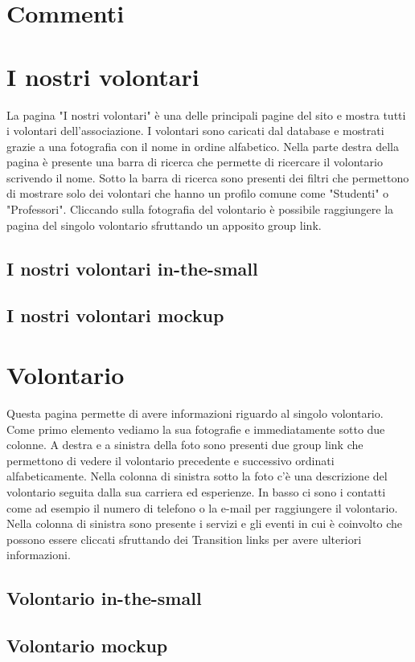     \section{Commenti}
    \section{I nostri volontari}
    La pagina "I nostri volontari" è una delle principali pagine del sito e
    mostra tutti i volontari dell'associazione. I volontari sono caricati dal
    database e mostrati grazie a una fotografia con il nome in ordine
    alfabetico. Nella parte destra della pagina è presente una barra di ricerca
    che permette di ricercare il volontario scrivendo il nome. Sotto la barra di
    ricerca sono presenti dei filtri che permettono di mostrare solo dei volontari che hanno un
    profilo comune come "Studenti" o "Professori".
    Cliccando sulla fotografia del volontario è possibile raggiungere la pagina
    del singolo volontario sfruttando un apposito group link.
        \subsection{I nostri volontari in-the-small}
        \subsection{I nostri volontari mockup}
    \section{Volontario}
    Questa pagina permette di avere informazioni riguardo al singolo volontario.
    Come primo elemento vediamo la sua fotografie e immediatamente sotto due
    colonne. A destra e a sinistra della foto sono presenti due group link che
    permettono di vedere il volontario precedente e successivo ordinati
    alfabeticamente. Nella colonna di sinistra sotto la foto c'è una descrizione del
    volontario seguita dalla sua carriera ed esperienze. In basso ci sono i
    contatti come ad esempio il numero di telefono o la e-mail per raggiungere
    il volontario. Nella colonna di sinistra sono presente i servizi e gli
    eventi in cui è coinvolto che possono essere cliccati sfruttando dei
    Transition links per avere ulteriori informazioni.
        \subsection{Volontario in-the-small}
        \subsection{Volontario mockup}